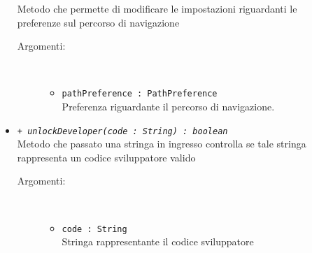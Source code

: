 \documentclass[../DefinizioneDiProdotto.tex]{subfiles}
\begin{document}
\begin{description}
\begin{itemize}
		Metodo che permette di modificare le impostazioni riguardanti le preferenze sul percorso di navigazione
		\begin{description}
			\item[Argomenti:] \
			\begin{itemize}
				\item \texttt{pathPreference : PathPreference}\\
				Preferenza riguardante il percorso di navigazione.\end{itemize}
		\end{description}
		\item \texttt{+ \textit{unlockDeveloper(code : String) : boolean}}\\
		Metodo che passato una stringa in ingresso controlla se tale stringa rappresenta un codice sviluppatore valido
		\begin{description}
			\item[Argomenti:] \
			\begin{itemize}
				\item \texttt{code : String}\\
				Stringa rappresentante il codice sviluppatore\end{itemize}
		\end{description}
	\end{itemize}
\end{description}
\end{document}
